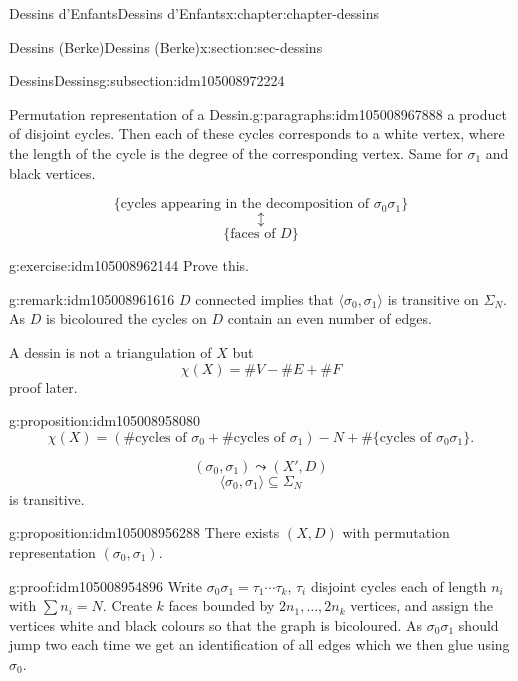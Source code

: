 \documentclass[oneside,10pt,]{book}
\numberwithin{equation}{section}
\begin{document}
\begin{chapterptx}{Dessins d'Enfants}{}{Dessins d'Enfants}{}{}{x:chapter:chapter-dessins}
\begin{sectionptx}{Dessins (Berke)}{}{Dessins (Berke)}{}{}{x:section:sec-dessins}
\begin{subsectionptx}{Dessins}{}{Dessins}{}{}{g:subsection:idm105008972224}
\begin{paragraphs}{Permutation representation of a Dessin.}{g:paragraphs:idm105008967888}
a product of disjoint cycles. Then each of these cycles corresponds to a  white vertex, where the length of the cycle is the degree of the corresponding vertex. Same for \(\sigma_1\) and black vertices.%
\par
%
\begin{equation*}
\{\text{cycles appearing in the decomposition of }\sigma_0\sigma_1\}
\end{equation*}
%
\begin{equation*}
\updownarrow
\end{equation*}
%
\begin{equation*}
\{\text{faces of }D\}
\end{equation*}
%
\begin{inlineexercise}{}{g:exercise:idm105008962144}%
Prove this.%
\end{inlineexercise}
\begin{remark}{}{g:remark:idm105008961616}%
\(D\) connected implies that \(\langle \sigma_0, \sigma_1 \rangle\) is transitive on \(\Sigma_N\). As \(D\) is bicoloured the cycles on \(D\) contain an even number of edges.%
\end{remark}
A dessin is not a triangulation of \(X\) but%
\begin{equation*}
\chi (X) = \#V -  \#E  + \#F
\end{equation*}
proof later.%
\begin{proposition}{}{}{g:proposition:idm105008958080}%
%
\begin{equation*}
\chi(X) = (\#\text{cycles of }\sigma_0+\#\text{cycles of }\sigma_1) - N + \#\{\text{cycles of }\sigma_0\sigma_1\}\text{.}
\end{equation*}
%
\end{proposition}
%
\begin{equation*}
(\sigma_0, \sigma_1) \leadsto (X',D)
\end{equation*}
%
\begin{equation*}
\langle \sigma_0, \sigma_1 \rangle \subseteq \Sigma_N
\end{equation*}
is transitive.%
\begin{proposition}{}{}{g:proposition:idm105008956288}%
There exists \((X,D)\) with permutation representation \((\sigma_0, \sigma_1)\).%
\end{proposition}
\begin{proofptx}{}{g:proof:idm105008954896}
Write \(\sigma_0\sigma_1 = \tau_1 \cdots \tau_k\), \(\tau_i\) disjoint cycles each of length \(n_i\) with \(\sum n_i = N\). Create \(k\) faces bounded by \(2n_1, \ldots, 2n_k\) vertices, and assign the vertices white and black colours so that the graph is bicoloured. As \(\sigma_0\sigma_1\) should jump two each time we get an identification of all edges which we then  glue using \(\sigma_0\).%

\end{proofptx}
\end{paragraphs}
\end{subsectionptx}
\end{sectionptx}
\end{chapterptx}
\end{document}
